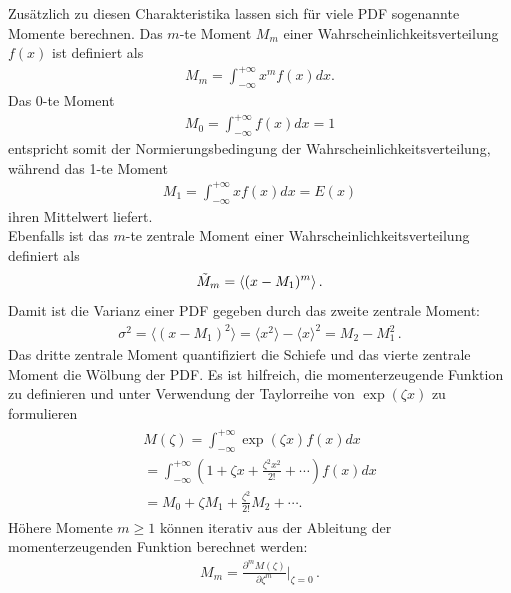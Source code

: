 Zusätzlich zu diesen Charakteristika lassen sich für viele PDF sogenannte Momente berechnen. Das $m$-te Moment $M_m$ einer Wahrscheinlichkeitsverteilung $f(x)$ ist definiert als
\begin{align}
M_m = \int_{-\infty}^{+\infty} x^mf(x)dx.
\end{align}
Das 0-te Moment
\begin{align}
M_0 = \int_{-\infty}^{+\infty} f(x)dx = 1
\end{align}
entspricht somit der Normierungsbedingung der Wahrscheinlichkeitsverteilung, während das 1-te Moment
\begin{align}
M_1 = \int_{-\infty}^{+\infty} xf(x)dx = E(x)
\end{align}
ihren Mittelwert liefert. \\

Ebenfalls ist das $m$-te zentrale Moment einer Wahrscheinlichkeitsverteilung definiert als
\begin{align}
\Tilde{M}_m = \langle ( x - M_1 )^m \rangle\,.
\end{align}
Damit ist die Varianz einer PDF gegeben durch das zweite zentrale Moment:
\begin{align}
\sigma^2 = \langle ( x - M_1)^2 \rangle = \langle x^2 \rangle - \langle x \rangle^2 = M_2 - M_1^2\,.
\end{align}
Das dritte zentrale Moment quantifiziert die  Schiefe und das vierte zentrale Moment die Wölbung der PDF. Es ist hilfreich, die momenterzeugende Funktion zu definieren und unter Verwendung der Taylorreihe von $\exp ( \zeta x )$ zu formulieren
\begin{align}
\begin{split}
M ( \zeta ) = \int_{-\infty}^{+\infty} \exp ( \zeta x ) f ( x ) dx \\ 
= \int_{-\infty}^{+\infty} \left( 1 + \zeta x + \frac{ \zeta^2 x^2 }{ 2! } + \cdots \right) f ( x ) dx\\
= M_0 + \zeta M_1 + \frac{ \zeta^2 }{ 2! } M_2 + \cdots .
\end{split}
\end{align}
Höhere Momente $m \geq 1$ können iterativ aus der Ableitung der momenterzeugenden Funktion berechnet werden:
\begin{align}
M_m = \frac{ \partial^m M ( \zeta ) }{ \partial \zeta^m} \bigg|_{\zeta = 0}\,.
\end{align}\\

